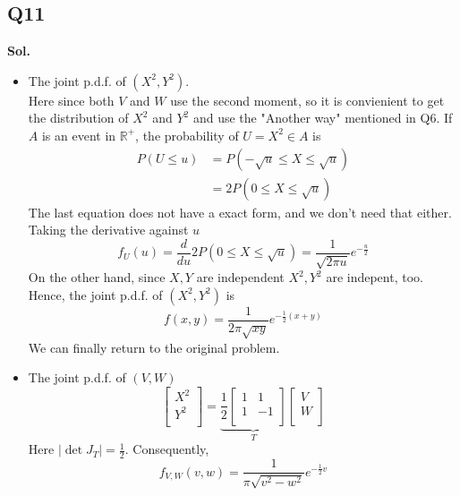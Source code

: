 \documentclass[12pt]{article}
\begin{document}
\subsection*{Q11}
\textbf{Sol.} \\
\begin{itemize}
    \item The joint p.d.f. of \((X^2,Y^2)\). \\ 
    Here since both \(V\) and \(W\) use the second moment, so it is convienient to 
    get the distribution of \(X^2\) and \(Y^2\) and use the "Another way" mentioned in Q6. 
    If \(A \) is an event in \(\mathbb{R}^+\), the probability of \(U = X^2 \in A\) is    
    \begin{equation*}
        \begin{aligned}
            P(U \leq u) &= P(-\sqrt{u} \leq  X\leq \sqrt{u} )
                     \\ &= 2P(0\leq X \leq \sqrt{u} )
        \end{aligned}
    \end{equation*}
    The last equation does not have a exact form, and we don't need that either. 
    Taking the derivative against \(u\) 
    \[
      f_U(u) = \frac{d}{du} 2 P(0 \leq X \leq \sqrt{u} ) = \frac{1}{\sqrt{2\pi u}} e^{-\frac{u}{2}}
    \]  
    On the other hand, since \(X,Y\) are independent \(X^2, Y^2\) are indepent, too.
   Hence, the joint p.d.f. of \((X^{2} , Y^{2} )\) is 
   \[
      f(x,y) = \frac{1}{2\pi \sqrt{xy} } e^{-\frac{1}{2}(x+y)}
   \]  
   We can finally return to the original problem. 
   \item The joint p.d.f. of \((V,W)\)\\ 
   \[
      \begin{bmatrix}
          X^2 \\
          Y^2 \\
      \end{bmatrix} = \underbrace{\frac{1}{2} \begin{bmatrix}
         1 & 1  \\
         1 & -1  \\
      \end{bmatrix}}_{T}
      \begin{bmatrix}
          V \\
          W \\
      \end{bmatrix}
   \]
   Here \(|\det{J_T}| = \frac{1}{2}\). 
   Consequently,  
   \[
      f_{V,W}(v,w) = \frac{1}{\pi \sqrt{v^2 - w^2} } e^{-\frac{1}{2}v}
\]
\end{itemize}
\end{document}
